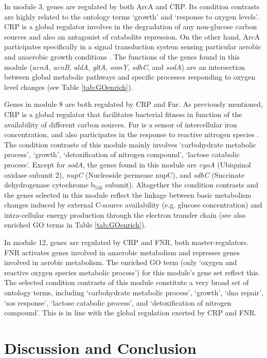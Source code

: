 In module 3, genes are regulated by both ArcA and CRP. Its condition
contrasts are highly related to the ontology terms `growth' and
`response to oxygen levels'. CRP is a global regulator involves in the
degradation of any non-glucose carbon sources and also an antagonist of
catabolite repression. On the other hand, ArcA participates specifically
in a signal transduction system sensing particular aerobic and anaerobic
growth conditions \cite{Compan1994}. 
The functions of the genes found in this module
(\textit{acnA}, \textit{acnB}, \textit{aldA}, \textit{gltA}, \textit{osmY}, 
\textit{sdhC}, and \textit{sodA}) are an intersection
between global metabolic pathways and specific processes responding to
oxygen level changes (see Table \ref{tab:GOenrich}).

Genes in module 8 are both regulated by CRP and Fur. As previously
mentioned, CRP is a global regulator that facilitates bacterial fitness
in function of the availability of different carbon sources. Fur is a
sensor of intercellular iron concentration, and also participates in the
response to reactive nitrogen species \cite{Mukhopadhyay2004}. 
The condition contrasts of
this module mainly involves `carbohydrate metabolic process', `growth',
`detoxification of nitrogen compound', `lactose catabolic
process'. Except for \textit{sodA}, the genes found in this module are 
\textit{cyoA} (Ubiquinol oxidase subunit 2), \textit{nupC} (Nucleoside permease 
nupC), and \textit{sdhC} (Succinate dehydrogenase cytochrome b$_{556}$ subunit).
Altogether the condition contrasts and the genes selected in this module 
reflect the linkage between basic metabolism changes induced by external 
C-source availability (e.g. glucose concentration) and intra-cellular energy
production through the electron transfer chain (see also enriched GO
terms in Table \ref{tab:GOenrich}).  

In module 12, genes are regulated by CRP and FNR,
both master-regulators. FNR activates genes involved in anaerobic
metabolism and represses genes involved in aerobic metabolism. The
enriched GO term (only `oxygen and reactive oxygen species metabolic
process') for this module's gene set reflect this. The selected
condition contrasts of this module constitute a very broad set of
ontology terms, including `carbohydrate metabolic process', `growth',
`dna repair', `sos response', `lactose catabolic process', and
`detoxification of nitrogen compound'. This is in line with the global
regulation exerted by CRP and FNR.


\section{Discussion and Conclusion}

